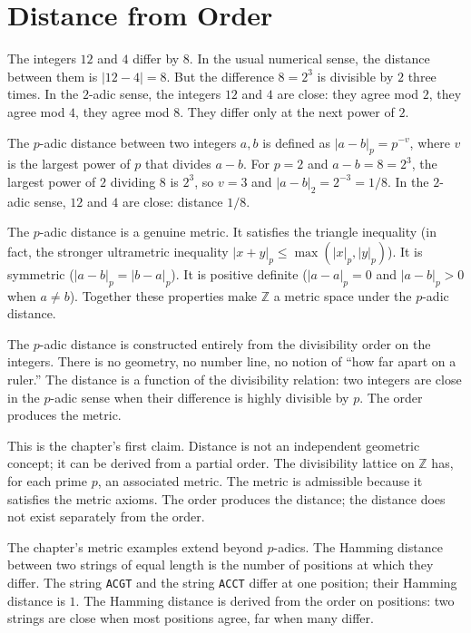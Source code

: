 \section{Distance from Order}
\label{se:distance-from-order}

The integers $12$ and $4$ differ by $8$. In the usual numerical sense,
the distance between them is $|12 - 4| = 8$. But the difference $8 =
2^3$ is divisible by $2$ three times. In the $2$-adic sense, the
integers $12$ and $4$ are close: they agree mod $2$, they agree mod
$4$, they agree mod $8$. They differ only at the next power of $2$.

The $p$-adic distance between two integers $a, b$ is defined as
$|a - b|_p = p^{-v}$, where $v$ is the largest power of $p$ that
divides $a - b$. For $p = 2$ and $a - b = 8 = 2^3$, the largest power
of $2$ dividing $8$ is $2^3$, so $v = 3$ and $|a - b|_2 = 2^{-3} =
1/8$. In the $2$-adic sense, $12$ and $4$ are close: distance $1/8$.

The $p$-adic distance is a genuine metric. It satisfies the triangle
inequality (in fact, the stronger ultrametric inequality $|x + y|_p \le
\max(|x|_p, |y|_p)$). It is symmetric ($|a - b|_p = |b - a|_p$). It
is positive definite ($|a - a|_p = 0$ and $|a - b|_p > 0$ when $a
\neq b$). Together these properties make $\mathbb{Z}$ a metric space
under the $p$-adic distance.

The $p$-adic distance is constructed entirely from the divisibility
order on the integers. There is no geometry, no number line, no notion
of ``how far apart on a ruler.'' The distance is a function of the
divisibility relation: two integers are close in the $p$-adic sense
when their difference is highly divisible by $p$. The order produces
the metric.

This is the chapter's first claim. Distance is not an independent
geometric concept; it can be derived from a partial order. The
divisibility lattice on $\mathbb{Z}$ has, for each prime $p$, an
associated metric. The metric is admissible because it satisfies
the metric axioms. The order produces the distance; the distance
does not exist separately from the order.

The chapter's metric examples extend beyond $p$-adics. The Hamming
distance between two strings of equal length is the number of
positions at which they differ. The string \texttt{ACGT} and the
string \texttt{ACCT} differ at one position; their Hamming distance
is $1$. The Hamming distance is derived from the order on positions:
two strings are close when most positions agree, far when many
differ.

